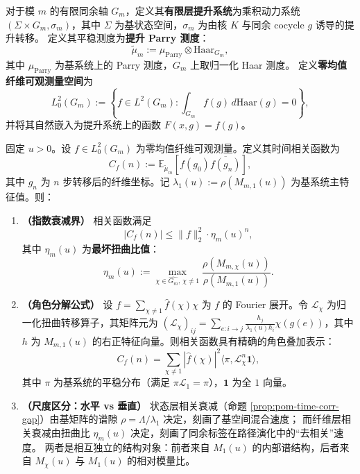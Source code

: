 \begin{definition}[有限层提升系统与纤维测度]\label{def:pom-lifted-system-m}
对于模 $m$ 的有限同余轴 $G_m$，定义其\textbf{有限层提升系统}为乘积动力系统 $(\Sigma \times G_m, \sigma_m)$，其中 $\Sigma$ 为基状态空间，$\sigma_m$ 为由核 $K$ 与同余 cocycle $g$ 诱导的提升转移。
定义其平稳测度为\textbf{提升 Parry 测度}：
\[
\widetilde\mu_m := \mu_{\mathrm{Parry}} \otimes \mathrm{Haar}_{G_m},
\]
其中 $\mu_{\mathrm{Parry}}$ 为基系统上的 Parry 测度，$G_m$ 上取归一化 Haar 测度。
定义\textbf{零均值纤维可观测量空间}为
\[
L^2_0(G_m) := \left\{ f \in L^2(G_m) : \int_{G_m} f(g) \, d\mathrm{Haar}(g) = 0 \right\},
\]
并将其自然嵌入为提升系统上的函数 $F(x, g) = f(g)$。
\end{definition}

\begin{theorem}[同余纤维相关衰减率 = 最坏扭曲比]\label{thm:pom-fiber-corr-decay}
固定 $u>0$。设 $f \in L^2_0(G_m)$ 为零均值纤维可观测量。定义其时间相关函数为
\[
C_f(n) := \mathbb{E}_{\widetilde\mu_m} [f(g_0) \overline{f(g_n)}],
\]
其中 $g_n$ 为 $n$ 步转移后的纤维坐标。记 $\lambda_1(u) := \rho(M_{m,1}(u))$ 为基系统主特征值。则：
\begin{enumerate}
    \item \textbf{（指数衰减界）} 相关函数满足
    \[
    |C_f(n)| \le \|f\|_2^2 \cdot \eta_m(u)^n,
    \]
    其中 $\eta_m(u)$ 为\textbf{最坏扭曲比值}：
    \[
    \eta_m(u) := \max_{\chi \in \widehat{G_m},\, \chi \neq 1} \frac{\rho(M_{m,\chi}(u))}{\rho(M_{m,1}(u))}.
    \]
    \item \textbf{（角色分解公式）} 设 $f = \sum_{\chi \neq 1} \hat{f}(\chi) \chi$ 为 $f$ 的 Fourier 展开。令 $\mathcal{L}_\chi$ 为归一化扭曲转移算子，其矩阵元为 $(\mathcal{L}_\chi)_{ij} = \sum_{e:i\to j} \frac{h_j}{\lambda_1(u) h_i} \chi(g(e))$，其中 $h$ 为 $M_{m,1}(u)$ 的右正特征向量。则相关函数具有精确的角色叠加表示：
    \[
    C_f(n) = \sum_{\chi \neq 1} |\hat{f}(\chi)|^2 \langle \pi, \mathcal{L}_\chi^n \mathbf{1} \rangle,
    \]
    其中 $\pi$ 为基系统的平稳分布（满足 $\pi \mathcal{L}_1 = \pi$），$\mathbf{1}$ 为全 $1$ 向量。
    \item \textbf{（尺度区分：水平 vs 垂直）} 
    状态层相关衰减（命题 \ref{prop:pom-time-corr-gap}）由基矩阵的谱隙 $\rho = \Lambda/\lambda_1$ 决定，刻画了基空间混合速度；
    而纤维层相关衰减由扭曲比 $\eta_m(u)$ 决定，刻画了同余标签在路径演化中的“去相关”速度。
    两者是相互独立的结构对象：前者来自 $M_1(u)$ 的内部谱结构，后者来自 $M_\chi(u)$ 与 $M_1(u)$ 的相对模量比。
\end{enumerate}
\end{theorem}

